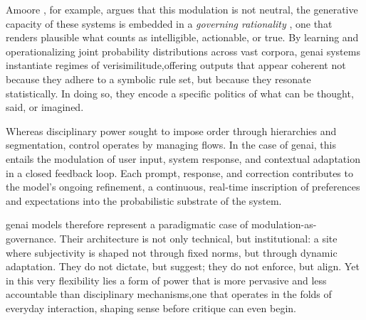 Amoore \parencite*{amoore2024}, for example, argues that this modulation is not neutral, the generative capacity of these systems is embedded in a \textit{governing rationality} \parencite{amoore2024}, one that renders plausible what counts as intelligible, actionable, or true. By learning and operationalizing joint probability distributions across vast corpora, \gls{genai} systems instantiate regimes of verisimilitude,offering outputs that appear coherent not because they adhere to a symbolic rule set, but because they resonate statistically. In doing so, they encode a specific politics of what can be thought, said, or imagined.

Whereas disciplinary power sought to impose order through hierarchies and segmentation, control operates by managing flows. In the case of \gls{genai}, this entails the modulation of user input, system response, and contextual adaptation in a closed feedback loop. Each prompt, response, and correction contributes to the model’s ongoing refinement, a continuous, real-time inscription of preferences and expectations into the probabilistic substrate of the system.

\Gls{genai} models therefore represent a paradigmatic case of modulation-as-governance. Their architecture is not only technical, but institutional: a site where subjectivity is shaped not through fixed norms, but through dynamic adaptation. They do not dictate, but suggest; they do not enforce, but align. Yet in this very flexibility lies a form of power that is more pervasive and less accountable than disciplinary mechanisms,one that operates in the folds of everyday interaction, shaping sense before critique can even begin.

